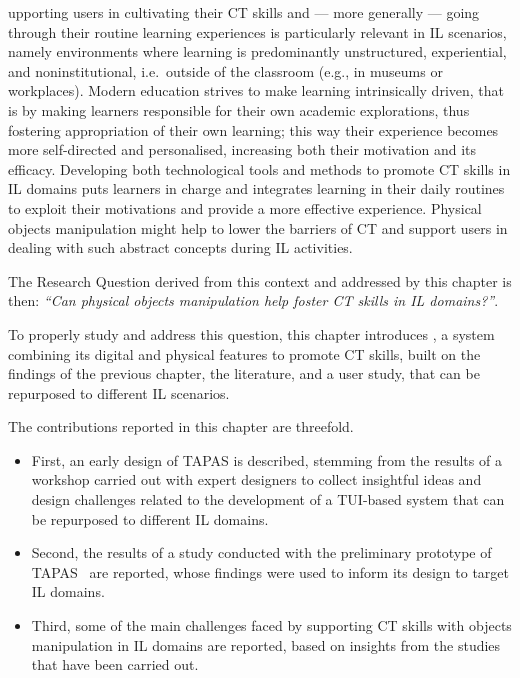
upporting users in cultivating their \ac{CT} skills and --- more generally --- going through their routine learning experiences is particularly relevant in \ac{IL} scenarios, namely environments where learning is predominantly unstructured, experiential, and noninstitutional, i.e.\ outside of the classroom (e.g., in museums or workplaces). Modern education strives to make learning intrinsically driven, that is by making learners responsible for their own academic explorations, thus fostering appropriation of their own learning; this way their experience becomes more self-directed and personalised, increasing both their motivation and its efficacy. Developing both technological tools and methods to promote \ac{CT} skills in \ac{IL} domains puts learners in charge and integrates learning in their daily routines to exploit their motivations and provide a more effective experience. Physical objects manipulation might help to lower the barriers of \ac{CT} and support users in dealing with such abstract concepts during \ac{IL} activities.

The Research Question derived from this context and addressed by this chapter is then: \textit{``Can physical objects manipulation help foster \ac{CT} skills in \ac{IL} domains?''}.

To properly study and address this question, this chapter introduces , a system combining its digital and physical features to promote \ac{CT} skills, built on the findings of the previous chapter, the literature, and a user study, that can be repurposed to different \ac{IL} scenarios.

The contributions reported in this chapter are threefold.
\begin{itemize}
  \item First, an early design of \ac{TAPAS} is described, stemming from the results of a workshop carried out with expert designers to collect insightful ideas and design challenges related to the development of a \ac{TUI}-based system that can be repurposed to different \ac{IL} domains.
  \item Second, the results of a study conducted with the preliminary prototype of \ac{TAPAS}~\cite{Turchi:2015dr,Turchi:2015kr} are reported, whose findings were used to inform its design to target \ac{IL} domains.
  \item Third, some of the main challenges faced by supporting \ac{CT} skills with objects manipulation in \ac{IL} domains are reported, based on insights from the studies that have been carried out.
\end{itemize}

